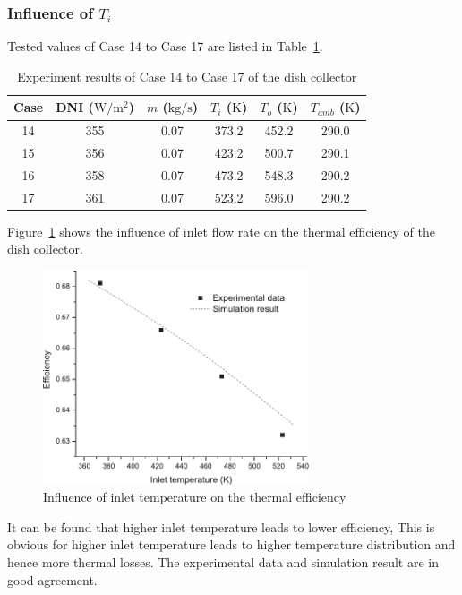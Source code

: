 \subsubsection{Influence of $T_i$}

Tested values of Case 14 to Case 17 are listed in Table~\ref{tab:ResultOfDish3}.

\begin{table}[htbp]\footnotesize
	\caption{Experiment results of Case 14 to Case 17 of the dish collector}
	\begin{center}
	\begin{tabular}{cccccc}
		\toprule
		Case	& DNI ($\mathrm{W/m^2}$)	&	$\dot{m}$ ($\mathrm{kg/s}$)			&	$T_i$ ($\mathrm{K}$)	&	$T_o$ ($\mathrm{K}$)		&	$T_{amb}$ ($\mathrm{K}$)\\
		\midrule
		14	&	355	&	0.07	&	373.2	&	452.2	&	290.0\\
		15	&	356	&	0.07	&	423.2	&	500.7	&	290.1\\
		16	&	358	&	0.07	&	473.2	&	548.3	&	290.2	\\
		17	&	361	&	0.07	&	523.2	&	596.0	&	290.2\\
		\bottomrule
	\end{tabular}
	\end{center}
	\label{tab:ResultOfDish3}
\end{table}

Figure~\ref{fig:T_i-eta} shows the influence of inlet flow rate on the thermal efficiency of the dish collector.
\begin{figure}[!ht]
\centering
\includegraphics[width=0.7\textwidth]{fig/T_i-eta}
\caption{Influence of inlet temperature on the thermal efficiency}
\label{fig:T_i-eta}
\end{figure}

It can be found that higher inlet temperature leads to lower efficiency, This is obvious for higher inlet temperature leads to higher temperature distribution and hence more thermal losses. The experimental data and simulation result are in good agreement.

